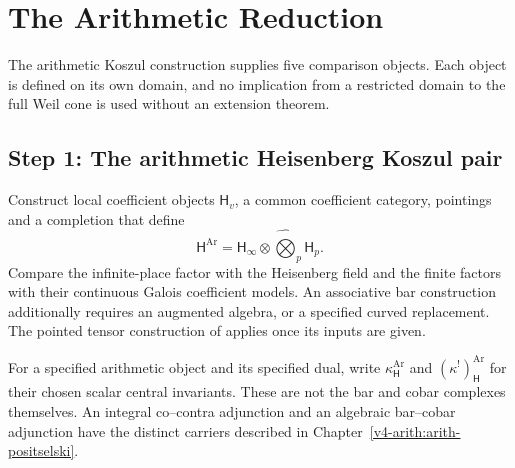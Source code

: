 \section{The Arithmetic Reduction}
\label{v4-arith:w5-direct:programme-elementary}

The arithmetic Koszul construction supplies five comparison objects.
Each object is defined on its own domain, and no implication from a
restricted domain to the full Weil cone is used without an extension
theorem.

\subsection{Step 1: The arithmetic Heisenberg Koszul pair}
\label{v4-arith:w5-direct:step-1}

\begin{question}
\label{v4-arith:w5-direct:def:heisenberg}
Construct local coefficient objects \(\mathsf H_v\), a common
coefficient category, pointings and a completion that define
\begin{equation}
\label{v4-arith:w5-direct:eq:heis}
 \mathsf H^{\mathrm{Ar}}
 =\mathsf H_\infty\widehat\otimes
                    \widehat\bigotimes_p\mathsf H_p.
\end{equation}
Compare the infinite-place factor with the Heisenberg field and
the finite factors with their continuous Galois coefficient
models. An associative bar construction additionally requires
an augmented algebra, or a specified curved replacement.
The pointed tensor construction of
 applies once its inputs are given.
\end{question}

\begin{definition}
\label{v4-arith:w5-direct:def:koszul}
For a specified arithmetic object and its specified dual,
write \(\kappa^{\mathrm{Ar}}_{\mathsf H}\) and
\((\kappa^!)^{\mathrm{Ar}}_{\mathsf H}\) for their chosen
scalar central invariants. These are not the bar and cobar
complexes themselves.
An integral co--contra adjunction and an algebraic bar--cobar
adjunction have the distinct carriers described in
Chapter~\ref{v4-arith:arith-positselski}.
\end{definition}

